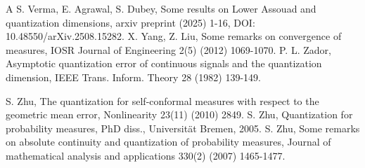 \documentclass{amsproc}
\theoremstyle{definition}
\theoremstyle{remark}
\numberwithin{equation}{section}
\begin{document}
\begin{thebibliography}{A}
 S. Verma, E. Agrawal, S. Dubey, Some results on Lower Assouad and quantization dimensions, arxiv preprint (2025) 1-16, DOI: 10.48550/arXiv.2508.15282.
  X. Yang, Z. Liu, Some remarks on convergence of measures, IOSR Journal of Engineering 2(5) (2012) 1069-1070.
     P. L. Zador, Asymptotic quantization error of continuous signals and the
     quantization dimension, IEEE Trans. Inform. Theory 28 (1982) 139-149.
    
     S. Zhu, The quantization for self-conformal measures with respect to the geometric mean error, Nonlinearity 23(11) (2010) 2849.
 S. Zhu, Quantization for probability measures, PhD diss., Universität Bremen, 2005.
 S. Zhu, Some remarks on absolute continuity and quantization of probability measures, Journal of mathematical analysis and applications 330(2) (2007) 1465-1477.
\end{thebibliography}
\end{document}
